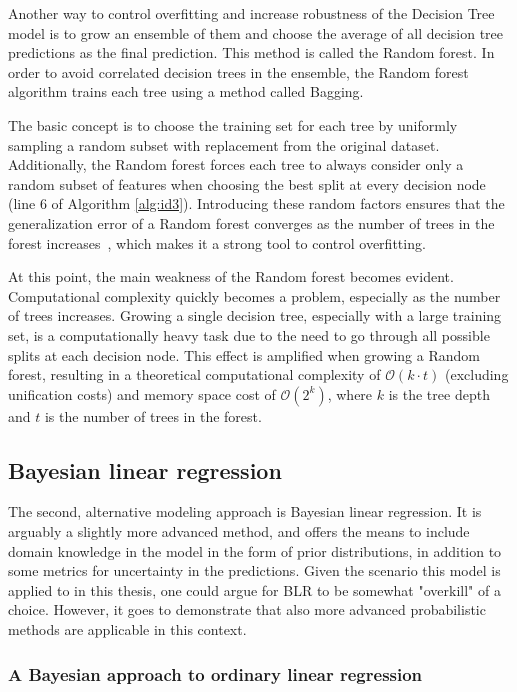 \documentclass[english, 12pt, a4paper, sci, utf8, a-2b, online]{aaltothesis}
\begin{document}
Another way to control overfitting and increase robustness of the Decision Tree model is to grow an ensemble of them and choose the average of all decision tree predictions as the final prediction.
This method is called the Random forest. In order to avoid correlated decision trees in the ensemble, the Random forest algorithm trains each tree using a method called Bagging.~\cite{jung}

The basic concept is to choose the training set for each tree by uniformly sampling a random subset with replacement from the original dataset. Additionally, the Random forest forces each tree to
always consider only a random subset of features when choosing the best split at every decision node (line 6 of Algorithm \ref{alg:id3}). Introducing these random factors ensures that the
generalization error of a Random forest converges as the number of trees in the forest increases~\cite{breiman}, which makes it a strong tool to control overfitting.

At this point, the main weakness of the Random forest becomes evident. Computational complexity quickly becomes a problem, especially as the number of trees increases. Growing a single decision
tree, especially with a large training set, is a computationally heavy task due to the need to go through all possible splits at each decision node. This effect is amplified when growing a
Random forest, resulting in a theoretical computational complexity of $\mathcal{O}(k\cdot t)$ (excluding unification costs) and memory space cost of $\mathcal{O}(2^k)$, where $k$ is the tree
depth and $t$ is the number of trees in the forest.~\cite{sole}

\subsection{Bayesian linear regression}

The second, alternative modeling approach is Bayesian linear regression. It is arguably a slightly more advanced method, and offers the means to include domain knowledge in the model in the form
of prior distributions, in addition to some metrics for uncertainty in the predictions. Given the scenario this model is applied to in this thesis, one could argue for BLR to be somewhat "overkill"
of a choice. However, it goes to demonstrate that also more advanced probabilistic methods are applicable in this context.

\subsubsection{A Bayesian approach to ordinary linear regression} \label{blm}
\end{document}

